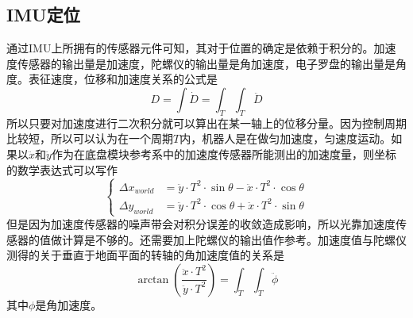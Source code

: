\subsection{IMU定位}
通过IMU上所拥有的传感器元件可知，其对于位置的确定是依赖于积分的。加速度传感器的输出量是加速度，陀螺仪的输出量是角加速度，电子罗盘的输出量是角度。表征速度，位移和加速度关系的公式是 \\
\begin{equation}
D = \int\dot{D}=\int_T\int_T\ddot{D}
\end{equation}
所以只要对加速度进行二次积分就可以算出在某一轴上的位移分量。因为控制周期比较短，所以可以认为在一个周期$T$内，机器人是在做匀加速度，匀速度运动。如果以$\ddot{x}$和$\ddot{y}$作为在底盘模块参考系中的加速度传感器所能测出的加速度量，则坐标的数学表达式可以写作 \\
\begin{equation}
		\left\{
             \begin{array}{lcl}
            	\Delta x_{world} &= \ddot{y}\cdot T^2\cdot \sin\theta - \ddot{x}\cdot T^2\cdot \cos\theta \\
             	\Delta y_{world} &= \ddot{y}\cdot T^2\cdot \cos\theta + \ddot{x}\cdot T^2\cdot \sin\theta  
             \end{array}  
        \right.
\end{equation}
但是因为加速度传感器的噪声带会对积分误差的收敛造成影响，所以光靠加速度传感器的值做计算是不够的。还需要加上陀螺仪的输出值作参考。加速度值与陀螺仪测得的关于垂直于地面平面的转轴的角加速度值的关系是 \\
\begin{equation}
\arctan(\frac{\ddot{x}\cdot T^2}{\ddot{y}\cdot T^2}) = \int_T\int_T \ddot{\phi}
\end{equation}
其中$\phi$是角加速度。

